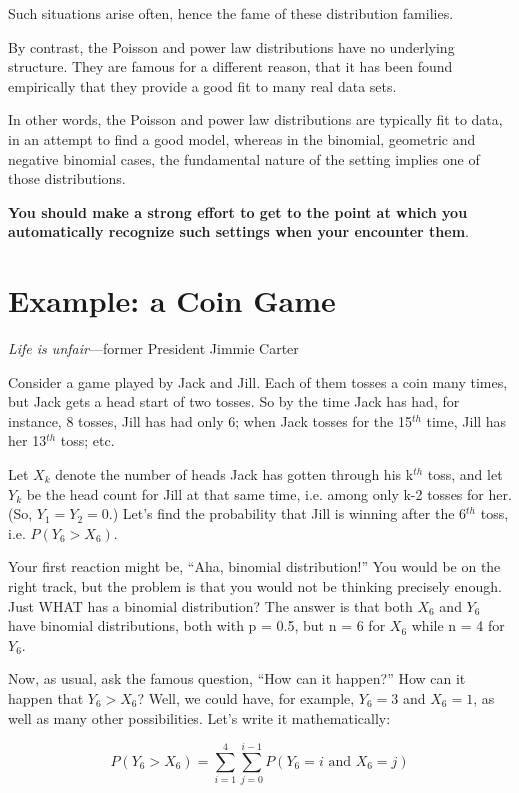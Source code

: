 Such situations arise often, hence the fame of these distribution
families.

By contrast, the Poisson and power law distributions have no underlying
structure.  They are famous for a different reason, that it has been
found empirically that they provide a good fit to many real data sets.

In other words, the Poisson and power law distributions are typically
fit to data, in an attempt to find a good model, whereas in the binomial,
geometric and negative binomial cases, the fundamental nature of the
setting implies one of those distributions.

{\bf You should make a strong effort to get to the point at which you
automatically recognize such settings when your encounter them}.

\section{Example:  a Coin Game}
\label{coingame}

{\it Life is unfair}---former President Jimmie Carter

\bigskip

Consider a game played by Jack and Jill. Each of them tosses a coin many
times, but Jack gets a head start of two tosses. So by the time Jack has
had, for instance, 8 tosses, Jill has had only 6; when Jack tosses for
the 15$^{th}$ time, Jill has her 13$^{th}$ toss; etc.

Let $X_k$ denote the number of heads Jack has gotten through his
k$^{th}$ toss, and let $Y_k$ be the head count for Jill at that same
time, i.e.  among only k-2 tosses for her. (So, $Y_1 = Y_2 = 0$.)
Let's find the probability that Jill is winning after the 6$^{th}$
toss, i.e. $P(Y_6 > X_6)$.

Your first reaction might be, ``Aha, binomial distribution!''  You would
be on the right track, but the problem is that you would not be thinking
precisely enough.  Just WHAT has a binomial distribution?  The answer is
that both $X_6$ and $Y_6$ have binomial distributions, both with p =
0.5, but n = 6 for $X_6$ while n = 4 for $Y_6$.

Now, as usual, ask the famous question, ``How can it happen?''  How can
it happen that  $Y_6 > X_6$?  Well, we could have, for example, $Y_6 = 3$
and $X_6 = 1$, as well as many other possibilities.  Let's write it
mathematically:

\begin{equation}
\label{ygx}
P(Y_6 > X_6) = \sum_{i=1}^4 \sum_{j=0}^{i-1} P(Y_6 = i \textrm{ and } X_6 = j)
\end{equation}

